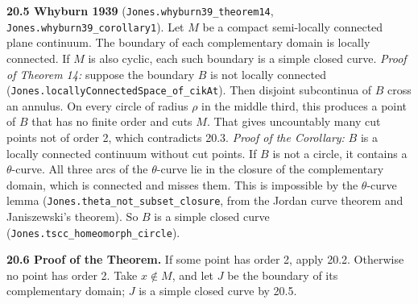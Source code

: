 \documentclass[11pt]{article}
\newcommand{\lean}[1]{\texttt{#1}}
\begin{document}
\textbf{20.5 Whyburn 1939} (\lean{Jones.\hspace{0pt}whyburn39\_\hspace{0pt}theorem14}, \lean{Jones.\hspace{0pt}whyburn39\_\hspace{0pt}corollary1}). Let $M$ be a compact semi-locally connected plane continuum. The boundary of each complementary domain is locally connected. If $M$ is also cyclic, each such boundary is a simple closed curve. \emph{Proof of Theorem 14:} suppose the boundary $B$ is not locally connected (\lean{Jones.\hspace{0pt}locallyConnectedSpace\_\hspace{0pt}of\_\hspace{0pt}cikAt}). Then disjoint subcontinua of $B$ cross an annulus. On every circle of radius $\rho$ in the middle third, this produces a point of $B$ that has no finite order and cuts $M$. That gives uncountably many cut points not of order 2, which contradicts 20.3. \emph{Proof of the Corollary:} $B$ is a locally connected continuum without cut points. If $B$ is not a circle, it contains a $\theta$-curve. All three arcs of the $\theta$-curve lie in the closure of the complementary domain, which is connected and misses them. This is impossible by the $\theta$-curve lemma (\lean{Jones.\hspace{0pt}theta\_\hspace{0pt}not\_\hspace{0pt}subset\_\hspace{0pt}closure}, from the Jordan curve theorem and Janiszewski's theorem). So $B$ is a simple closed curve (\lean{Jones.\hspace{0pt}tscc\_\hspace{0pt}homeomorph\_\hspace{0pt}circle}).

\textbf{20.6 Proof of the Theorem.} If some point has order 2, apply 20.2. Otherwise no point has order 2. Take $x \notin M$, and let $J$ be the boundary of its complementary domain; $J$ is a simple closed curve by 20.5.
\end{document}
